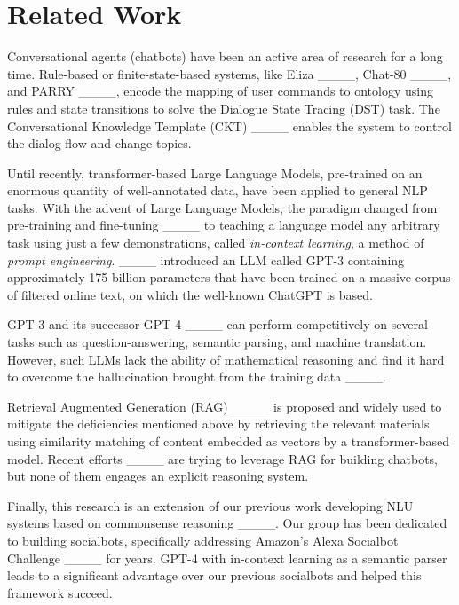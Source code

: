 \section{Related Work}
Conversational agents (chatbots) have been an active area of research for a long time.
Rule-based or finite-state-based systems, like Eliza ____, Chat-80 ____, and PARRY ____, encode the mapping of user commands to ontology using rules and state transitions to solve the Dialogue State Tracing (DST) task.
The Conversational Knowledge Template (CKT) ____ enables the system to control the dialog flow and change topics. 

Until recently, transformer-based Large Language Models, pre-trained on an enormous quantity of well-annotated data, have been applied to general NLP tasks. With the advent of Large Language Models, the paradigm changed from pre-training and fine-tuning ____ to teaching a language model any arbitrary task using just a few demonstrations, called \textit{in-context learning}, a method of \textit{prompt engineering}. ____ introduced an LLM called GPT-3 containing approximately 175 billion parameters that have been trained on a massive corpus of filtered online text, on which the well-known ChatGPT is based.

GPT-3 and its successor GPT-4 ____ can perform competitively on several tasks such as question-answering, semantic parsing, and machine translation. However, such LLMs lack the ability of mathematical reasoning and find it hard to overcome the hallucination brought from the training data ____.  

Retrieval Augmented Generation (RAG) ____ is proposed and widely used to mitigate the deficiencies mentioned above by retrieving the relevant materials using similarity matching of content embedded as vectors by a transformer-based model.
Recent efforts ____ are trying to leverage RAG for building chatbots, but none of them engages an explicit reasoning system.

Finally, this research is an extension of our previous work developing NLU systems based on commonsense reasoning ____. Our group has been dedicated to building socialbots, specifically addressing Amazon's Alexa Socialbot Challenge ____ for years. GPT-4 with in-context learning as a semantic parser leads to a significant advantage over our previous socialbots and helped this framework succeed.